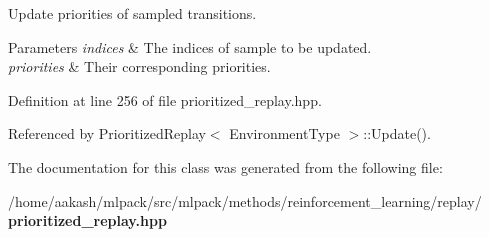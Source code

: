 Update priorities of sampled transitions. 


\begin{DoxyParams}{Parameters}
{\em indices} & The indices of sample to be updated. \\
\hline
{\em priorities} & Their corresponding priorities. \\
\hline
\end{DoxyParams}


Definition at line 256 of file prioritized\+\_\+replay.\+hpp.



Referenced by Prioritized\+Replay$<$ Environment\+Type $>$\+::\+Update().



The documentation for this class was generated from the following file\+:\begin{DoxyCompactItemize}
\item 
/home/aakash/mlpack/src/mlpack/methods/reinforcement\+\_\+learning/replay/\textbf{ prioritized\+\_\+replay.\+hpp}\end{DoxyCompactItemize}

